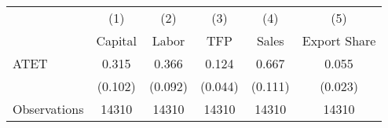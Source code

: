 \begin{tabular}{l*{5}{c}}
\hline\hline
                    &\multicolumn{1}{c}{(1)}&\multicolumn{1}{c}{(2)}&\multicolumn{1}{c}{(3)}&\multicolumn{1}{c}{(4)}&\multicolumn{1}{c}{(5)}\\
                    &\multicolumn{1}{c}{Capital}&\multicolumn{1}{c}{Labor}&\multicolumn{1}{c}{TFP}&\multicolumn{1}{c}{Sales}&\multicolumn{1}{c}{Export Share}\\
\hline
ATET                &       0.315&       0.366&       0.124&       0.667&       0.055\\
                    &     (0.102)&     (0.092)&     (0.044)&     (0.111)&     (0.023)\\
\hline
Observations        &       14310&       14310&       14310&       14310&       14310\\
\hline\hline
\end{tabular}
